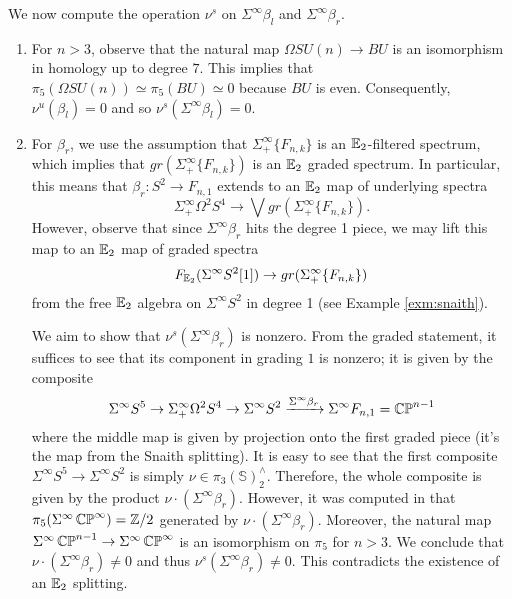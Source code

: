 We now compute the operation $\nu^s$ on $\Sigma^{\infty} \beta_l$ and $\Sigma^{\infty} \beta_r$.  
\begin{enumerate}
\item For $n>3$, observe that the natural map $\Omega SU(n) \to BU$ is an isomorphism in homology up to degree $7$.  This implies that $\pi_5(\Omega SU(n)) \simeq \pi_5(BU) \simeq 0$ because $BU$ is even.  Consequently, $\nu^u(\beta_l) = 0$ and so $\nu^s(\Sigma^{\infty} \beta_l) = 0.$  

\item For $\beta_r$, we use the assumption that $\Sigma^{\infty}_+ \{ F_{n,k} \}$ is an $\operatorname{\mathbb{E}}_2$-filtered spectrum, which implies that $gr(\Sigma^{\infty}_+ \{ F_{n,k} \})$ is an $\operatorname{\mathbb{E}}_2$ graded spectrum.  In particular, this means that $\beta_r: S^2 \to F_{n,1}$ extends to an $\operatorname{\mathbb{E}}_2$ map of underlying spectra $$\Sigma^{\infty}_+ \Omega^2 S^4 \to \bigvee gr(\Sigma^{\infty}_+ \{ F_{n,k} \}).$$  However, observe that since $\Sigma^{\infty} \beta_r$ hits the degree 1 piece, we may lift this map to an $\operatorname{\mathbb{E}}_2$ map of graded spectra $$F_{\operatorname{\mathbb{E}}_2}(\Sigma^\infty S^2[1]) \to gr(\Sigma^{\infty}_+ \{ F_{n,k} \})$$ from the free $\operatorname{\mathbb{E}}_2$ algebra on $\Sigma^{\infty} S^2$ in degree 1 (see Example \ref{exm:snaith}).  %

We aim to show that $\nu^s(\Sigma^\infty \beta_r)$ is nonzero.  From the graded statement, it suffices to see that its component in grading $1$ is nonzero; it is given by the composite $$\Sigma^{\infty} S^5 \to \Sigma^{\infty}_+ \Omega^2 S^4 \to \Sigma^{\infty} S^2 \xrightarrow{\Sigma^{\infty} \beta_r} \Sigma^{\infty} F_{n,1} = \operatorname{\mathbb{CP}}^{n-1}$$ where the middle map is given by projection onto the first graded piece (it's the map from the Snaith splitting).  It is easy to see that the first composite $\Sigma^{\infty} S^5 \to \Sigma^{\infty} S^2$ is simply $\nu \in \pi_3(\mathbb{S})^{\wedge}_2.$  Therefore, the whole composite is given by the product $\nu\cdot (\Sigma^{\infty} \beta_r).$  
However, it was computed in \cite[Theorem II.8]{Liulevicius} that $\pi_5(\Sigma^{\infty}\operatorname{\mathbb{CP}}^{\infty})=\mathbb{Z}/2$ generated by $\nu \cdot (\Sigma^{\infty}\beta_r).$  Moreover, the natural map $\Sigma^{\infty}\operatorname{\mathbb{CP}}^{n-1} \to \Sigma^{\infty}\operatorname{\mathbb{CP}}^\infty$ is an isomorphism on $\pi_5$ for $n>3$.  We conclude that $\nu \cdot (\Sigma^{\infty}\beta_r )\neq 0$ and thus $\nu^s(\Sigma^{\infty} \beta_r) \neq 0$.  This contradicts the existence of an $\operatorname{\mathbb{E}}_2$ splitting.  



\end{enumerate}

